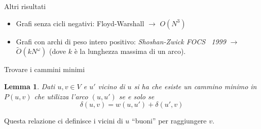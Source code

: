 \documentclass{beamer}
\newcounter{counter1}
\theoremstyle{plain}
\newtheorem{mylem}[counter1]{Lemma}
\theoremstyle{definition}
\theoremstyle{remark}
\newcommand{\pa}[1]{\left(#1\right)}
\begin{document}
\begin{frame}{Altri risultati}
  \begin{itemize}
  \item Grafi senza cicli negativi: Floyd-Warshall $\rightarrow$ $O \pa{N^3}$
  \item Grafi con archi di peso intero positivo: \textit{Shoshan-Zwick
      FOCS~ 1999} $\rightarrow$ $\tilde O \pa{k N^\omega}$ (dove $k$ \`e la
    lunghezza massima di un arco).
  \end{itemize}
\end{frame}

\begin{frame}{Trovare i cammini minimi}
  \begin{mylem}
    Dati $u,v \in V$ e $u'$ vicino di $u$ si ha che esiste un cammino
    minimo in $P(u,v)$ che utilizza l'arco $(u,u')$ se e solo se
    \[ \delta \pa{ u,v} = w\pa{ u,u' } + \delta \pa{ u',v} \]
  \end{mylem}
  \vfill
  
  Questa relazione ci definisce i vicini di $u$ ``buoni'' per
  raggiungere $v$.
\end{frame}
\end{document}
